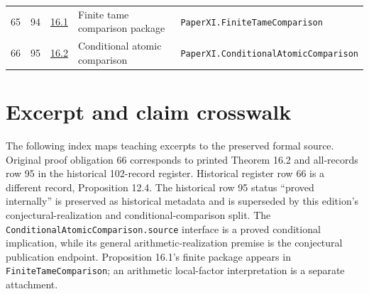 \documentclass[10pt,oneside]{book}
\begin{document}
\begin{longtable}{@{}p{}p{}p{}>{\raggedright\arraybackslash}p{}p{}@{}}
65&94&\href{https://komorebi.invalid/b06/obligation_65}{16.1}&Finite tame comparison package&\nolinkurl{PaperXI.FiniteTameComparison}\\

66&95&\href{https://komorebi.invalid/b06/obligation_66}{16.2}&Conditional atomic comparison&\nolinkurl{PaperXI.ConditionalAtomicComparison}\\

\bottomrule\end{longtable}

\chapter{Excerpt and claim crosswalk}

The following index maps teaching excerpts to the preserved formal source. Original proof obligation 66 corresponds to printed Theorem 16.2 and all-records row 95 in the historical 102-record register. Historical register row 66 is a different record, Proposition 12.4. The historical row 95 status ``proved internally'' is preserved as historical metadata and is superseded by this edition's conjectural-realization and conditional-comparison split. The \texttt{ConditionalAtomicComparison.source} interface is a proved conditional implication, while its general arithmetic-realization premise is the conjectural publication endpoint. Proposition 16.1's finite package appears in \texttt{FiniteTameComparison}; an arithmetic local-factor interpretation is a separate attachment.
\end{document}
